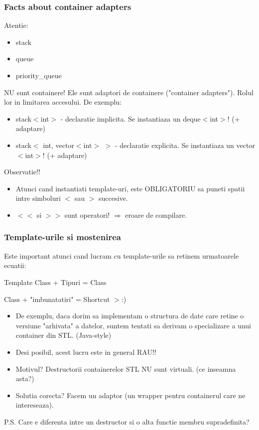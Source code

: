\documentclass{beamer}
\begin{document}
  \begin{frame}
  \frametitle{Facts about container adapters}
  Atentie: \begin{itemize} \item stack \item queue \item priority\_queue \end{itemize} NU sunt containere!
  \pause Ele sunt adaptori de containere ("container adapters"). Rolul lor in limitarea accesului.
  \pause De exemplu:
  \begin{itemize}
  \pause \item stack$<$int$>$ - declaratie implicita. Se instantiaza un deque$<$int$>$! (+ adaptare)
  \pause \item stack$<$ int, vector$<$int$>$ $>$ - declaratie explicita. Se instantiaza un vector$<$int$>$! (+ adaptare)
  \end{itemize}
  Observatie!!
  \begin{itemize}
  \pause \item Atunci cand instantiati template-uri, este OBLIGATORIU sa puneti spatii intre simboluri $<$ sau $>$ succesive. 
  \pause \item $<<$ si $>>$ sunt operatori! $\Rightarrow$ eroare de compilare.
  \end{itemize}
  \end{frame}

  \begin{frame}
  \frametitle{Template-urile si mostenirea}
  Este important atunci cand lucram cu template-urile sa retinem urmatoarele ecuatii: 
  \pause \centerline{Template Class + Tipuri = Class}
  \pause \centerline{Class + "imbunatatiri" = Shortcut $>$:)}
  \begin{itemize}
  \pause \item De exemplu, daca dorim sa implementam o structura de date care retine o versiune "arhivata" a datelor, suntem tentati sa derivam o specializare a unui container din STL. (Java-style)
  \pause \item Desi posibil, acest lucru este in general RAU!!  
  \pause \item Motivul? \pause Destructorii containerelor STL NU sunt virtuali. (ce inseamna asta?)
  \pause \item Solutia corecta? \pause Facem un adaptor (un wrapper pentru containerul care ne intereseaza).
  \end{itemize}
  \pause P.S. Care e diferenta intre un destructor si o alta functie membru supradefinita?
  \end{frame}
\end{document}
